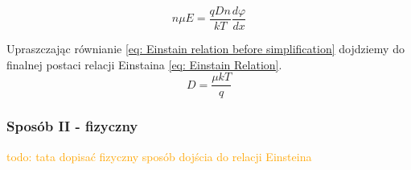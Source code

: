             \begin{minipage}[l]{0.49\textwidth}
                \begin{equation}
                    n\mu E = \frac{qDn}{kT} \frac{d \varphi }{dx} \label{eq: Einstain relation before simplification}
                \end{equation}
            \end{minipage}
            Upraszczając równianie \ref{eq: Einstain relation before simplification} dojdziemy do finalnej postaci relacji Einstaina \ref{eq: Einstain Relation}. 
            \begin{equation}
                D = \frac{\mu kT}{q} \label{eq: Einstain Relation}
            \end{equation}
        \subsubsection{Sposób II - fizyczny}
            \textcolor{orange}{todo: tata dopisać fizyczny sposób dojścia do relacji Einsteina}
    
